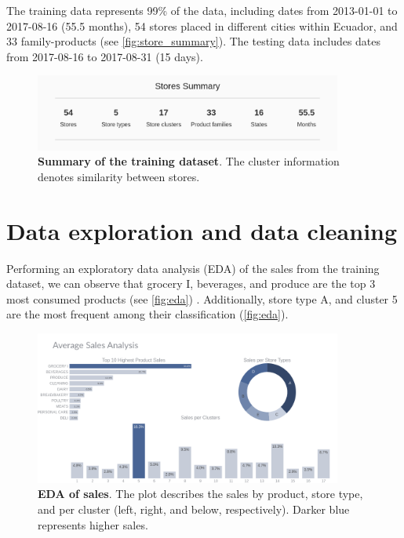 The training data represents 99\% of the data, including dates from 2013-01-01 to 2017-08-16 (55.5 months), 54 stores placed in different cities within Ecuador, and 33 family-products (see \autoref{fig:store_summary}). The testing data includes dates from 2017-08-16 to 2017-08-31 (15 days).

\begin{figure}[!htb]
  \centering
  \includegraphics[width=0.9\textwidth]{plots/data_description/stores_summary.png}
  \caption[Summary of the training dataset]{\textbf{Summary of the training dataset}. The cluster information denotes similarity between stores.}
  \label{fig:store_summary}
\end{figure}

\section[Data exploration and data cleaning]{Data exploration and data cleaning}
\label{sec:eda}

Performing an exploratory data analysis (EDA) of the sales from the training dataset, we can observe that grocery I, beverages, and produce are the top 3 most consumed products (see \autoref{fig:eda}) . Additionally, store type A, and cluster 5 are the most frequent among their classification (\autoref{fig:eda}).

\begin{figure}[!htb]
  \centering
  \includegraphics[width=0.9\textwidth]{plots/eda/sale_analysis.png}
  \caption[EDA of sales]{\textbf{EDA of sales}. The plot describes the sales by product, store type, and per cluster (left, right, and below, respectively). Darker blue represents higher sales. }
  \label{fig:eda}
\end{figure}


